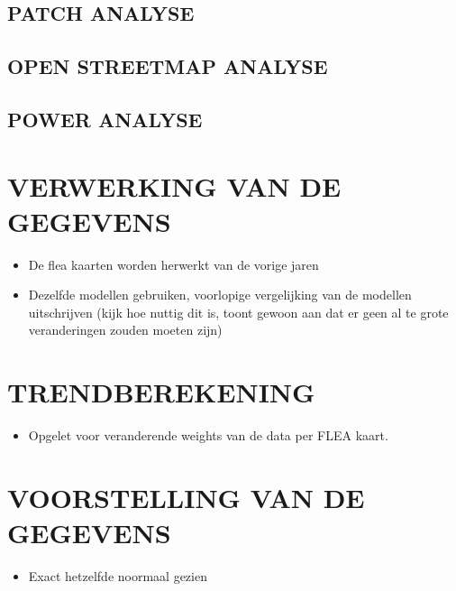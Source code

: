 \documentclass[twoside]{extreport}
\providecommand{\tightlist}{%
  \setlength{\itemsep}{0pt}\setlength{\parskip}{0pt}}
\begin{document}
\section{PATCH ANALYSE}\label{patch-analyse}

\section{OPEN STREETMAP ANALYSE}\label{open-streetmap-analyse}

\section{POWER ANALYSE}\label{power-analyse}


\chapter{VERWERKING VAN DE GEGEVENS}\label{verwerking-van-de-gegevens}

\begin{itemize}
\item
  De flea kaarten worden herwerkt van de vorige jaren
\item
  Dezelfde modellen gebruiken, voorlopige vergelijking van de modellen
  uitschrijven (kijk hoe nuttig dit is, toont gewoon aan dat er geen al
  te grote veranderingen zouden moeten zijn)
\end{itemize}


\chapter{TRENDBEREKENING}\label{trendberekening}

\begin{itemize}
\tightlist
\item
  Opgelet voor veranderende weights van de data per FLEA kaart.
\end{itemize}


\chapter{VOORSTELLING VAN DE
GEGEVENS}\label{voorstelling-van-de-gegevens}

\begin{itemize}
\tightlist
\item
  Exact hetzelfde noormaal gezien
\end{itemize}
\end{document}
